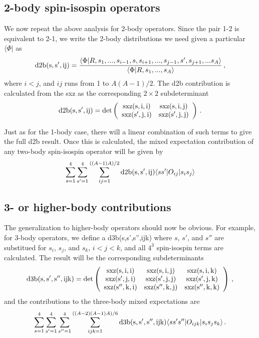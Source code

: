 \documentclass[12pt]{article}
\begin{document}
\subsection{2-body spin-isospin operators}
We now repeat the above analysis for 2-body operators. Since the pair
1-2 is equivalent to 2-1, we write the 2-body distributions we need
given a particular $\langle \Phi|$
as
\begin{equation}
{\rm d2b(s,s',ij)} =
\frac{\langle \Phi|R,s_1,...,s_{i-1},s,s_{i+1}
,...,s_{j-1},s',s_{j+1},...s_A\rangle}
{\langle \Phi|R,s_1,...,s_A\rangle}
\,,
\end{equation}
where $i<j$, and $ij$ runs from 1 to $A(A-1)/2$. The d2b contribution
is calculated from the sxz as the corresponding
$2\times 2$ subdeterminant
\begin{equation}
\rm {d2b(s,s',ij)} = \rm {det}
\left (
\begin{array}{cc}
\rm {sxz(s,i,i)} & \rm {sxz(s,i,j)}\\
\rm {sxz(s',j,i)} & \rm {sxz(s',j,j)}\\
\end{array}
\right ) \,.
\end{equation}

Just as for the 1-body case, there will a linear combination of
such terms to give the full d2b result. Once this is calculated, the
mixed expectation contribution of any
two-body spin-isospin operator will be given by
\begin{equation}
\sum_{s=1}^4 \sum_{s'=1}^4 \sum_{ij=1}^{((A-1)A)/2} {\rm d2b(s,s',ij)}
\langle s s'|O_{ij}|s_i s_j\rangle
\end{equation}

\subsection{3- or higher-body contributions}
The generalization to higher-body operators should now be obvious.
For example, for 3-body operators, we define a d3b(s,s',s'',ijk)
where $s$, $s'$, and $s''$ are substitued for $s_i$, $s_j$, and $s_k$,
$i<j<k$,
and all $4^3$ spin-isospin terms are calculated.
The result will be the corresponding subdeterminants
\begin{equation}
{\rm d3b(s,s',s'',ijk)} = \rm {det}
\left (
\begin{array}{ccc}
\rm {sxz(s,i,i)} & \rm {sxz(s,i,j)} & \rm {sxz(s,i,k)} \\
\rm {sxz(s',j,i)} & \rm {sxz(s',j,j)} & \rm {sxz(s',j,k)} \\
\rm {sxz(s'',k,i)} & \rm {sxz(s'',k,j)} & \rm {sxz(s'',k,k)} \\
\end{array}
\right )\,,
\end{equation}
and the contributions to the three-body mixed expectations are
\begin{equation}
\sum_{s=1}^4 \sum_{s'=1}^4 \sum_{s''=1}^4
\sum_{ijk=1}^{((A-2)(A-1)A)/6} {\rm d3b(s,s',s'',ijk)}
\langle s s' s''|O_{ijk}|s_i s_j s_k\rangle \,.
\end{equation}
\end{document}

